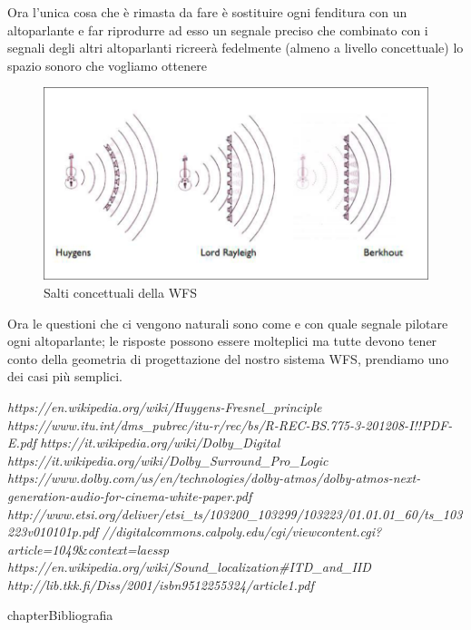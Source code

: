 \documentclass[12pt,a4paper]{report}
\begin{document}
Ora l'unica cosa che è rimasta da fare è sostituire ogni fenditura con un altoparlante e far riprodurre ad esso un  segnale preciso che combinato con i segnali degli altri altoparlanti ricreerà fedelmente (almeno a livello concettuale) lo spazio sonoro che vogliamo ottenere

\begin{figure}[htbp]
	\centering
	\includegraphics[scale=0.55]{figures/wfs.png}
	\caption {Salti concettuali della WFS} 
	\label{fig:wfs}
	\end{figure}
	

Ora le questioni che ci vengono naturali sono come e con quale segnale pilotare ogni altoparlante; le risposte possono essere molteplici ma tutte devono tener conto della geometria di progettazione del nostro sistema WFS, prendiamo uno dei casi più semplici.\\






\begin{thebibliography}{}

 \textit{https://en.wikipedia.org/wiki/Huygens-Fresnel\_principle}
 \textit{https://www.itu.int/dms\_pubrec/itu-r/rec/bs/R-REC-BS.775-3-201208-I!!PDF-E.pdf}
 \textit{https://it.wikipedia.org/wiki/Dolby\_Digital}
 \textit{https://it.wikipedia.org/wiki/Dolby\_Surround\_Pro\_Logic}
 \textit{https://www.dolby.com/us/en/technologies/dolby-atmos/dolby-atmos-next-generation-audio-for-cinema-white-paper.pdf}
\textit{http://www.etsi.org/deliver/etsi\_ts/103200\_103299/103223/01.01.01\_60/ts\_103223v010101p.pdf}
\textit{//digitalcommons.calpoly.edu/cgi/viewcontent.cgi?article=1049}\&\textit{context=laessp}
 \textit{https://en.wikipedia.org/wiki/Sound\_localization\#ITD\_and\_IID}
 \textit{http://lib.tkk.fi/Diss/2001/isbn9512255324/article1.pdf}
\end{thebibliography}
 {chapter}{Bibliografia}
\end{document}
